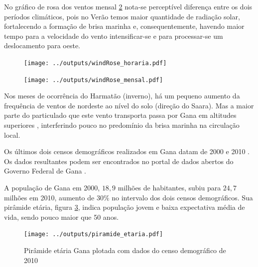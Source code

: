 No gráfico de rosa dos ventos mensal \ref{fig:windRose_mensal}
 nota-se 
perceptível diferença entre os dois períodos climáticos, 
pois no Verão temos maior quantidade de radiação solar, fortalecendo a 
formação de brisa marinha e, consequentemente, havendo maior tempo para a velocidade do vento intensificar-se e para processar-se um deslocamento para oeste.%

\begin{figure}[H]
  \centering
  \texttt{[image: ../outputs/windRose\_horaria.pdf]}
  \caption{ \citep{carslaw2012} \label{fig:windRose_horaria}}%
\end{figure}

\begin{figure}[H]
  \centering
  \texttt{[image: ../outputs/windRose\_mensal.pdf]}
  \caption{ \citep{carslaw2012} \label{fig:windRose_mensal}}
\end{figure}

Nos meses de ocorrência do Harmatão (inverno), há um pequeno aumento da frequência de ventos de nordeste ao nível do solo (direção do Saara). Mas a maior parte do particulado que este vento transporta passa por Gana 
em altitudes superiores \citep{breuning2005}, interferindo pouco no predomínio da brisa marinha na circulação local.%
%

Os últimos dois censos demográficos realizados em Gana datam
de 2000 \citep{ghanacensus2003} e 2010 \citep{ghanacensus2013}. Os
dados resultantes podem ser encontrados no portal de dados abertos
do Governo Federal de Gana \citep{opendataghana}.

A população de Gana em 2000, $18,9$ milhões de habitantes, subiu para $24,7$ 
milhões em 2010, aumento de $30\%$ no intervalo dos dois censos demográficos. 
Sua pirâmide etária, figura \ref{fig:piramedegana}, indica população 
jovem e baixa expectativa média de vida, sendo  pouco maior que 50 anos. %
\begin{figure}[H]
  \centering
  \texttt{[image: ../outputs/piramide\_etaria.pdf]}
  \caption{Pirâmide etária Gana plotada com dados do censo 
           demográfico de 2010 \citep{ghanacensus2013} \label{fig:piramedegana}}
\end{figure}

